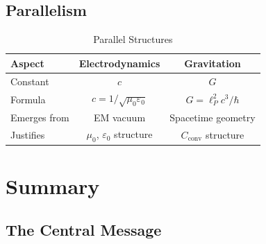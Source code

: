 	\subsection{Parallelism}
	
	\begin{table}[h]
		\centering
		\begin{tabular}{|l|c|c|}
			\hline
			\textbf{Aspect} & \textbf{Electrodynamics} & \textbf{Gravitation} \\
			\hline
			Constant & $c$ & $G$ \\
			Formula & $c = 1/\sqrt{\mu_0\varepsilon_0}$ & $G = \ell_P^2 c^3/\hbar$ \\
			Emerges from & EM vacuum & Spacetime geometry \\
			Justifies & $\mu_0$, $\varepsilon_0$ structure & $C_{\text{conv}}$ structure \\
			\hline
		\end{tabular}
		\caption{Parallel Structures}
	\end{table}
	
	\section{Summary}
	
	\subsection{The Central Message}
	
